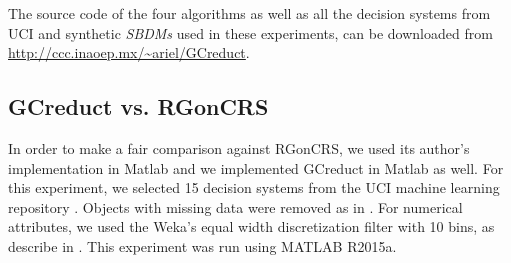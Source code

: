 \documentclass[number,preprint,review,12pt]{elsarticle}
\begin{document}
	The source code of the four algorithms as well as all the decision systems from UCI and synthetic \textit{SBDMs} used in these experiments, can be downloaded from \url{http://ccc.inaoep.mx/~ariel/GCreduct}.
	
\subsection{GCreduct vs. RGonCRS}\label{sub:matlab}
	In order to make a fair comparison against RGonCRS, we used its author's implementation in Matlab and we implemented GCreduct in Matlab as well. For this experiment, we selected 15 decision systems from the UCI machine learning repository \citep{Bache13}. Objects with missing data were removed as in \citep{WangP07}. For numerical attributes, we used the Weka's equal width discretization filter with 10 bins, as describe in \cite{Flores2010}. This experiment was run using MATLAB R2015a.
	
\end{document}
